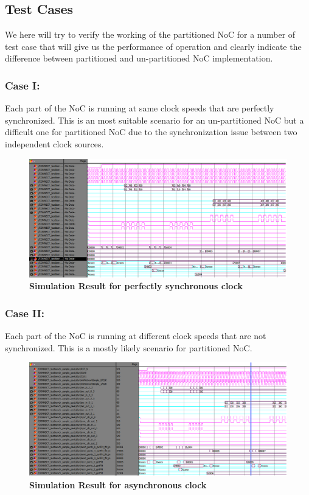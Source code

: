 \subsection{Test Cases}
We here will try to verify the working of the partitioned NoC for a number of test case that will give us the performance of operation and clearly indicate the difference between partitioned and un-partitioned NoC implementation.
\subsubsection{Case I:} Each part of the NoC is running at same clock speeds that are perfectly synchronized. This is an most suitable scenario for an un-partitioned NoC but a difficult one for partitioned NoC due to the synchronization issue between two independent clock sources.
\begin{figure}[H]
  \centering
   \includegraphics[scale=0.5]{./figs/SameClockTest}
  \caption{\textbf{Simulation Result for perfectly synchronous clock}}
  \label{SameCloclTest}
\end{figure}

\subsubsection{Case II:} Each part of the NoC is running at different clock speeds that are not synchronized. This is a mostly likely scenario for partitioned NoC.
\begin{figure}[H]
  \centering
   \includegraphics[scale=0.5]{./figs/DifferentClockTest}
  \caption{\textbf{Simulation Result for asynchronous clock}}
  \label{DifferentClockTest}
\end{figure}

